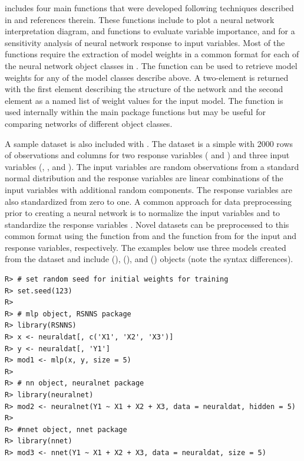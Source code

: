 \documentclass[article,shortnames]{jss}\usepackage[]{graphicx}\usepackage[]{color}
\makeatletter
\newenvironment{kframe}{%
 \def\at@end@of@kframe{}%
 \ifinner\ifhmode%
  \def\at@end@of@kframe{\end{minipage}}%
  \begin{minipage}{\columnwidth}%
 \fi\fi%
 \def\FrameCommand##1{\hskip\@totalleftmargin \hskip-\fboxsep
 \colorbox{shadecolor}{##1}\hskip-\fboxsep
     \hskip-\linewidth \hskip-\@totalleftmargin \hskip\columnwidth}%
 \MakeFramed {\advance\hsize-\width
   \@totalleftmargin\z@ \linewidth\hsize
   \@setminipage}}%
 {\par\unskip\endMakeFramed%
 \at@end@of@kframe}
\newenvironment{knitrout}{}{} %
\makeatother
\begin{document}
 includes four main functions that were developed following techniques described in \citet{Olden02} and references therein.  These functions include  to plot a neural network interpretation diagram,  and  functions to evaluate variable importance, and  for a sensitivity analysis of neural network response to input variables.  Most of the functions require the extraction of model weights in a common format for each of the neural network object classes in .  The  function can be used to retrieve model weights for any of the model classes describe above.  A two-element  is returned with the first element describing the structure of the network and the second element as a named list of weight values for the input model.  The function is used internally within the main package functions but may be useful for comparing networks of different object classes.

A sample dataset is also included with .  The  dataset is a simple  with 2000 rows of observations and columns for two response variables ( and ) and three input variables (, , and ).  The input variables are random observations from a standard normal distribution and the response variables are linear combinations of the input variables with additional random components.  The response variables are also standardized from zero to one.  A common approach for data preprocessing prior to creating a neural network is to normalize the input variables and to standardize the response variables \citep{Lek00,Olden02}.  Novel datasets can be preprocessed to this common format using the  function from  and the  function from  for the input and response variables, respectively.  The examples below use three models created from the  dataset and include  (),  (), and  () objects (note the syntax differences).


\begin{knitrout}
\color{fgcolor}\begin{kframe}
\begin{verbatim}
R> # set random seed for initial weights for training
R> set.seed(123)
R> 
R> # mlp object, RSNNS package
R> library(RSNNS)
R> x <- neuraldat[, c('X1', 'X2', 'X3')]
R> y <- neuraldat[, 'Y1']
R> mod1 <- mlp(x, y, size = 5)
R> 
R> # nn object, neuralnet package
R> library(neuralnet)
R> mod2 <- neuralnet(Y1 ~ X1 + X2 + X3, data = neuraldat, hidden = 5)
R> 
R> #nnet object, nnet package
R> library(nnet)
R> mod3 <- nnet(Y1 ~ X1 + X2 + X3, data = neuraldat, size = 5)
\end{verbatim}
\end{kframe}
\end{knitrout}
\end{document}
